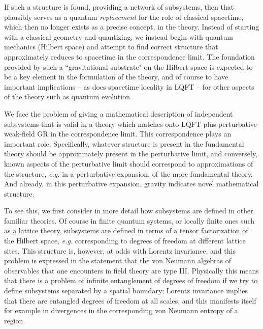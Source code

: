 If such a structure is found, providing a network of subsystems, then that plausibly serves as a quantum {\it replacement} for the role of classical spacetime, which then no longer exists as a precise concept, in the theory.  Instead of starting with a classical geometry and quantizing, we instead begin with quantum mechanics (Hilbert space) and attempt to find correct structure that approximately reduces to spacetime in the correspondence limit.
The foundation provided by such a ``gravitational substrate" on the Hilbert space is expected to be a key element in the formulation of the theory, and of course to have important implications -- as does spacetime locality in LQFT -- for other aspects of the theory such as quantum evolution.  
	



We face the problem of giving a mathematical description of independent subsystems that is valid in a theory which matches onto LQFT plus perturbative weak-field GR in the correspondence limit.  This correspondence plays an important role.  Specifically, whatever structure is present in the fundamental theory should be approximately present in the perturbative limit, and conversely, known aspects of the perturbative limit should correspond to approximations of the structure, {\it e.g.} in a perturbative expansion, of the more fundamental theory.  And already, in this perturbative expansion, gravity indicates novel mathematical structure.

To see this, we first consider in more detail how subsystems are defined in other familiar theories.  Of course in finite quantum systems, or locally finite ones such as a lattice theory, subsystems are defined in terms of a tensor factorization of the Hilbert space, {\it e.g.} corresponding to degrees of freedom at different lattice sites.  This structure is, however, at odds with Lorentz invariance, and this problem is expressed in the statement that the von Neumann algebras of observables that one encounters in field theory are type III.  Physically this means that there is a problem of infinite entanglement of degrees of freedom if we try to define subsystems separated by a spatial boundary; Lorentz invariance implies that there are entangled degrees of freedom at all scales, and this manifests itself for example in divergences in the corresponding von Neumann entropy of a region.  

